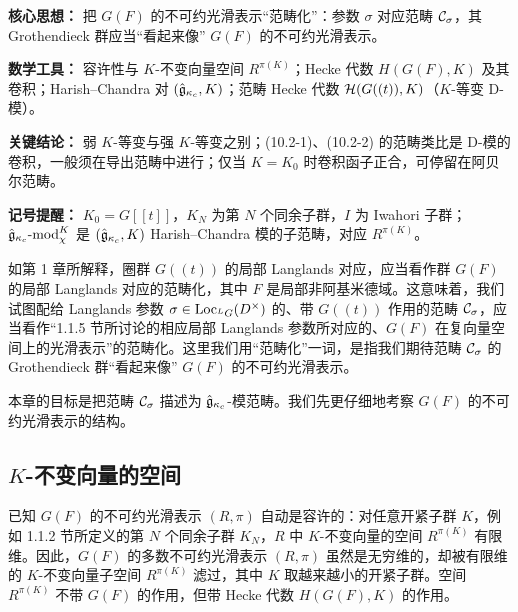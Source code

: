 \begin{keypoints}
    \item \textbf{核心思想：} 把 $G(F)$ 的不可约光滑表示“范畴化”：参数 $\sigma$ 对应范畴 $\mathcal{C}_\sigma$，其 Grothendieck 群应当“看起来像” $G(F)$ 的不可约光滑表示。
    \item \textbf{数学工具：} 容许性与 $K$-不变向量空间 $R^{\pi(K)}$；Hecke 代数 $H(G(F),K)$ 及其卷积；Harish--Chandra 对 $(\hat{\mathfrak{g}}_{\kappa_c},K)$；范畴 Hecke 代数 $\mathcal{H}(G((t)),K)$（$K$-等变 D-模）。
    \item \textbf{关键结论：} 弱 $K$-等变与强 $K$-等变之别；(10.2-1)、(10.2-2) 的范畴类比是 D-模的卷积，一般须在导出范畴中进行；仅当 $K=K_0$ 时卷积函子正合，可停留在阿贝尔范畴。
    \item \textbf{记号提醒：} $K_0=G[[t]]$，$K_N$ 为第 $N$ 个同余子群，$I$ 为 Iwahori 子群；$\hat{\mathfrak{g}}_{\kappa_c}\text{-}\mathrm{mod}_\chi^K$ 是 $(\hat{\mathfrak{g}}_{\kappa_c},K)$ Harish--Chandra 模的子范畴，对应 $R^{\pi(K)}$。
\end{keypoints}

如第 1 章所解释，圈群 $G((t))$ 的局部 Langlands 对应，应当看作群 $G(F)$ 的局部 Langlands 对应的范畴化，其中 $F$ 是局部非阿基米德域。这意味着，我们试图配给 Langlands 参数 $\sigma\in\operatorname{Loc}_{{}^L G}(D^\times)$ 的、带 $G((t))$ 作用的范畴 $\mathcal{C}_\sigma$，应当看作“1.1.5 节所讨论的相应局部 Langlands 参数所对应的、$G(F)$ 在复向量空间上的光滑表示”的范畴化。这里我们用“范畴化”一词，是指我们期待范畴 $\mathcal{C}_\sigma$ 的 Grothendieck 群“看起来像” $G(F)$ 的不可约光滑表示。

本章的目标是把范畴 $\mathcal{C}_\sigma$ 描述为 $\hat{\mathfrak{g}}_{\kappa_c}$-模范畴。我们先更仔细地考察 $G(F)$ 的不可约光滑表示的结构。

\subsection{\texorpdfstring{$K$}{K}-不变向量的空间}

已知 $G(F)$ 的不可约光滑表示 $(R,\pi)$ 自动是容许的：对任意开紧子群 $K$，例如 1.1.2 节所定义的第 $N$ 个同余子群 $K_N$，$R$ 中 $K$-不变向量的空间 $R^{\pi(K)}$ 有限维。因此，$G(F)$ 的多数不可约光滑表示 $(R,\pi)$ 虽然是无穷维的，却被有限维的 $K$-不变向量子空间 $R^{\pi(K)}$ 滤过，其中 $K$ 取越来越小的开紧子群。空间 $R^{\pi(K)}$ 不带 $G(F)$ 的作用，但带 Hecke 代数 $H(G(F),K)$ 的作用。

